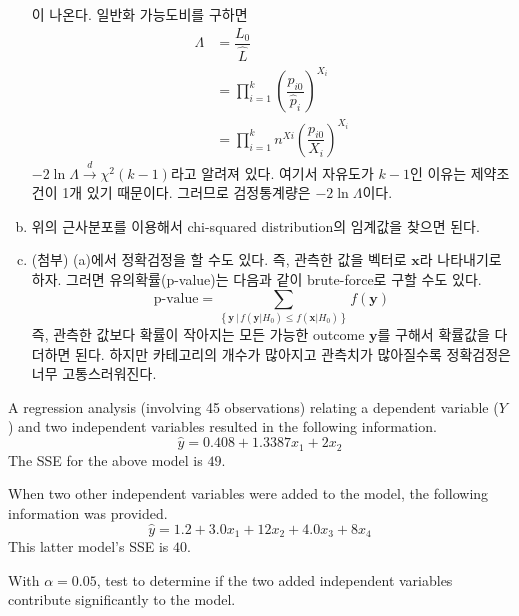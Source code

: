 \documentclass[answers]{exam}
\begin{document}
\begin{questions}
\begin{solution}
\begin{enumerate}[(a)]
\begin{equation}
      \end{equation}
      이 나온다. 일반화 가능도비를 구하면
      \begin{align}
        \Lambda &= \dfrac{L_{0}}{\widehat{L}}\\
        &= \prod_{i=1}^{k}\left(\dfrac{p_{i0}}{\hat{p}_{i}}\right)^{X_{i}}\\
        &= \prod_{i=1}^{k}n^{Xi}\left(\dfrac{p_{i0}}{X_{i}}\right)^{X_{i}}
      \end{align}
      $-2\ln\Lambda\xrightarrow{d}\chi^{2}\left(k-1\right)$라고 알려져 있다. 여기서 자유도가 $k-1$인 이유는 제약조건이 1개 있기 때문이다. 그러므로 검정통계량은 $-2\ln\Lambda$이다.
      \item 위의 근사분포를 이용해서 chi-squared distribution의 임계값을 찾으면 된다.
      \item (첨부) (a)에서 정확검정을 할 수도 있다. 즉, 관측한 값을 벡터로 $\mathbf{x}$라 나타내기로 하자. 그러면 유의확률(p-value)는 다음과 같이 brute-force로 구할 수도 있다.
      \begin{equation}
        \text{p-value} = \sum_{\left\{\mathbf{y}\,|\,f\left(\mathbf{y}|H_{0}\right)\leq f\left(\mathbf{x}|H_{0}\right) \right\}}f\left(\mathbf{y}\right)
      \end{equation}
      즉, 관측한 값보다 확률이 작아지는 모든 가능한 outcome $\mathbf{y}$를 구해서 확률값을 다 더하면 된다. 하지만 카테고리의 개수가 많아지고 관측치가 많아질수록 정확검정은 너무 고통스러워진다.
    \end{enumerate}
   \end{solution}
   \question
   A regression analysis (involving 45 observations) relating a dependent variable ($Y$) and two independent variables resulted in the following information.
   $$
    \hat{y} = 0.408+1.3387x_{1}+2x_{2}
   $$
   The SSE for the above model is $49$.\par
   When two other independent variables were added to the model, the following information was provided.
   $$
    \hat{y}=1.2+3.0x_{1}+12x_{2}+4.0x_{3}+8x_{4}
   $$
   This latter model's SSE is $40$.\par
   With $\alpha=0.05$, test to determine if the two added independent variables contribute significantly to the model.
   \begin{solution}

   \end{solution}
\end{questions}
\end{document}
